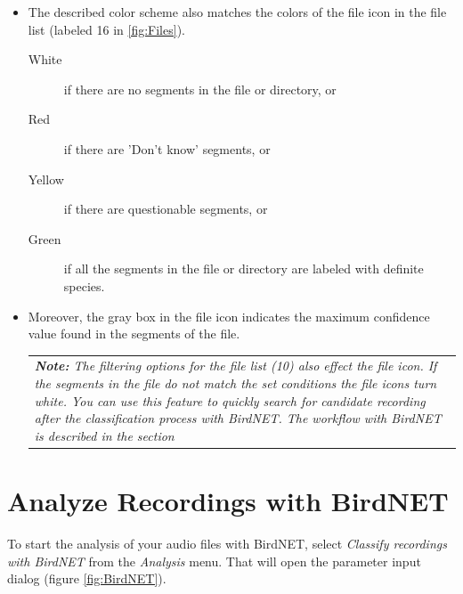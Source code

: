 \documentclass{scrartcl}
\begin{document}
\begin{itemize}
\item The described color scheme also matches the colors of the file icon in the file list (labeled 16 in \ref{fig:Files}). 
	\begin{description}
		\item[White]  if there are no segments in the file or directory, or
		\item[Red] if there are 'Don't know' segments, or
		\item[Yellow] if there are questionable segments, or
		\item[Green] if all the segments in the file or directory are labeled with definite species.
	\end{description}
	\item Moreover, the gray box in the file icon indicates the maximum confidence value found in the segments of the file.
	\begin{table}[ht!]
		\centering
		\begin{tabular}{p{}}
			\textit{\textbf{Note:} The filtering options for the file list (10) also effect the file icon. If the segments in the file do not match the set conditions the file icons turn white. You can use this feature to quickly search for candidate recording after the classification process with BirdNET. The workflow with BirdNET is described in the section \nameref{sec:BirdNET}}\\
		\end{tabular}
	\end{table}
\end{itemize}


\section{Analyze Recordings with BirdNET}\label{sec:BirdNET}

%

To start the analysis of your audio files with BirdNET, select \textit{Classify recordings with BirdNET} from the \textit{Analysis} menu.
That will open the parameter input dialog (figure \ref{fig:BirdNET}).
\end{document}
